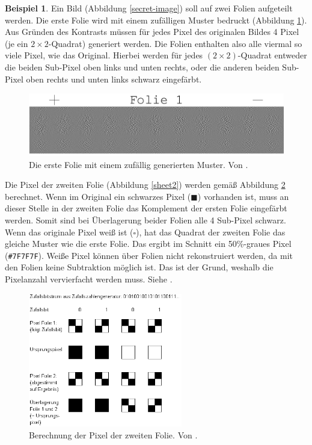 \documentclass[12pt, a4paper, oneside, titlepage]{report}
\theoremstyle{definition}
\newtheorem{bsp}[lemma]{Beispiel}
\begin{document}
	\begin{bsp}\label{ex:visual-sheets}
		Ein Bild (Abbildung \ref{secret-image}) soll auf zwei Folien aufgeteilt werden. Die erste Folie wird mit einem zufälligen Muster bedruckt (Abbildung \ref{sheet1}). Aus Gründen des Kontrasts müssen für jedes Pixel des originalen Bildes 4 Pixel (je ein $ 2 \times 2 $-Quadrat) generiert werden. Die Folien enthalten also alle viermal so viele Pixel, wie das Original. Hierbei werden für jedes $ (2 \times 2) $-Quadrat entweder die beiden Sub-Pixel oben links und unten rechts, oder die anderen beiden Sub-Pixel oben rechts und unten links schwarz eingefärbt.
		
		\begin{figure}[H]
			\centering
			\includegraphics[width=1.\textwidth]{images/visual2.png}
			\caption{Die erste Folie mit einem zufällig generierten Muster. Von \cite{visual}.}
			\label{sheet1}
		\end{figure}
		\noindent
		Die Pixel der zweiten Folie (Abbildung \ref{sheet2}) werden gemäß Abbildung \ref{generation-of-2nd-sheet} berechnet. Wenn im Original ein schwarzes Pixel ($ \blacksquare $) vorhanden ist, muss an dieser Stelle in der zweiten Folie das Komplement der ersten Folie eingefärbt werden. Somit sind bei Überlagerung beider Folien alle 4 Sub-Pixel schwarz. Wenn das originale Pixel weiß ist ($ \square $), hat das Quadrat der zweiten Folie das gleiche Muster wie die erste Folie. Das ergibt im Schnitt ein 50\%-graues Pixel (\texttt{\#7F7F7F}). Weiße Pixel können über Folien nicht rekonstruiert werden, da mit den Folien keine Subtraktion möglich ist. Das ist der Grund, weshalb die Pixelanzahl vervierfacht werden muss. Siehe \cite{visual}.
		
		\begin{figure}[H]
			\centering
			\includegraphics[width=0.6\textwidth]{images/visual1.png}
			\caption{Berechnung der Pixel der zweiten Folie. Von \cite{visual}.}
			\label{generation-of-2nd-sheet}
		\end{figure}
	

\end{bsp}
\end{document}
